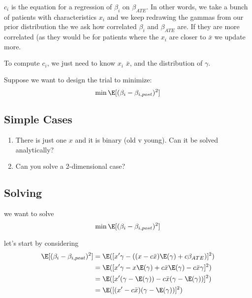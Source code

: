 \begin{enumerate}
\begin{enumerate}
				$c_i$ is the equation for a regression of $\beta_i$ on $\beta_{ATE}$. In other words, we take a bunch of patients with characteristics $x_i$ and we keep redrawing the gammas from our prior distribution the we ask how correlated  $\beta_i$ and $\beta_{ATE}$ are. If they are more correlated (as they would be for patients where the $x_i$ are closer to $\bar{x}$ we update more.

				To compute $c_i$, we just need to know $x_i$ $\bar{x}$, and the distribution of $\gamma$.

				Suppose we want to design the trial to minimize:
				\begin{align*}
					\min \E[(\beta_i - \beta_{i,post})^2]
				\end{align*} 
		\end{enumerate}

\end{enumerate} 

\subsection*{Simple Cases}
\begin{enumerate}
	\item There is just one $x$ and it is binary (old v young). Can it be solved analytically?
	\item Can you solve a 2-dimensional case? 
\end{enumerate}


\subsection*{Solving}

we want to solve
\begin{align*}
	\min \E[(\beta_i - \beta_{i,post})^2]
\end{align*} 

let's start by considering
\begin{align*}
	\E[(\beta_i - \beta_{i,post})^2] &= \E([ x' \gamma  - ((x - c\bar{x}) \E(\gamma) + c \beta_{ATE})]^2) \\
									 &= \E( [x' \gamma - x \E(\gamma) + c \bar{x} \E(\gamma) - c \bar{x} \gamma ]^2 ) \\
									 &= \E ( [x' ( \gamma - \E(\gamma)) - c\bar{x} ( \gamma - \E(\gamma))]^2) \\
									 &= \E([ ( x' - c \bar{x}) (\gamma - \E(\gamma))]^2) \\
\end{align*} 

